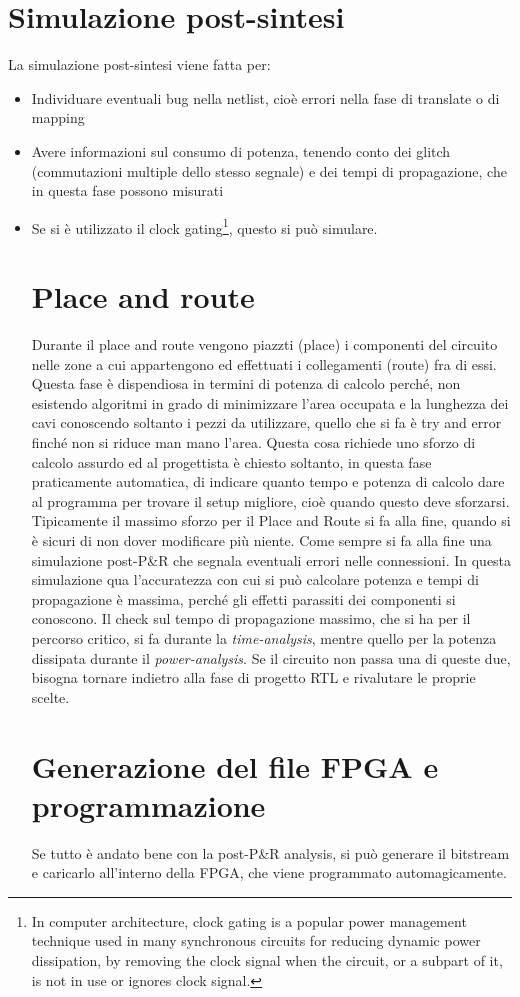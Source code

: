 \documentclass{book}
\begin{document}
\section{Simulazione post-sintesi}
    La simulazione post-sintesi viene fatta per:
    \begin{itemize}
        \item Individuare eventuali bug nella netlist, cioè errori nella fase di translate o di mapping
        \item Avere informazioni sul consumo di potenza, tenendo conto dei glitch (commutazioni multiple dello stesso segnale) e dei tempi di propagazione, che in questa fase possono misurati
        \item Se si è utilizzato il clock gating\footnote{In computer architecture, clock gating is a popular power management technique used in many synchronous circuits for reducing dynamic power dissipation, by removing the clock signal when the circuit, or a subpart of it, is not in use or ignores clock signal.}, questo si può simulare.
\section{Place and route}
    Durante il place and route vengono piazzti (place) i componenti del circuito nelle zone a cui appartengono ed effettuati i collegamenti (route) fra di essi. Questa fase è dispendiosa in termini di potenza di calcolo perché, non esistendo algoritmi in grado di minimizzare l'area occupata e la lunghezza dei cavi conoscendo soltanto i pezzi da utilizzare, quello che si fa è try and error finché non si riduce man mano l'area. Questa cosa richiede uno sforzo di calcolo assurdo ed al progettista è chiesto soltanto, in questa fase praticamente automatica, di indicare quanto tempo e potenza di calcolo dare al programma per trovare il setup migliore, cioè quando questo deve sforzarsi. Tipicamente il massimo sforzo per il Place and Route si fa alla fine, quando si è sicuri di non dover modificare più niente. Come sempre si fa alla fine una simulazione post-P\&R che segnala eventuali errori nelle connessioni. In questa simulazione qua l'accuratezza con cui si può calcolare potenza e tempi di propagazione è massima, perché gli effetti parassiti dei componenti si conoscono. Il check sul tempo di propagazione massimo, che si ha per il percorso critico, si fa durante la \textit{time-analysis}, mentre quello per la potenza dissipata durante il \textit{power-analysis}. Se il circuito non passa una di queste due, bisogna tornare indietro alla fase di progetto RTL e rivalutare le proprie scelte.
\section{Generazione del file FPGA e programmazione}
    Se tutto è andato bene con la post-P\&R analysis, si può generare il bitstream e caricarlo all'interno della FPGA, che viene programmato automagicamente.
    \end{itemize}
\end{document}
